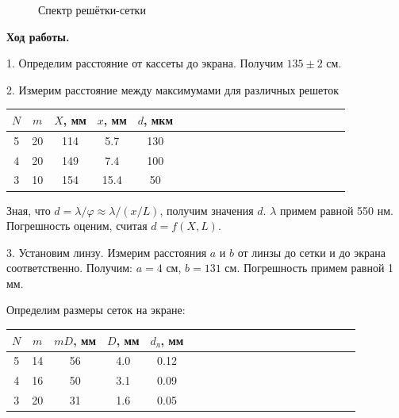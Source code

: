 \documentclass[14pt]{article}
\begin{document}
\begin{figure}[h!]
	\caption{Спектр решётки-сетки}
	\label{fig:image}
\end{figure}


\newpage
\textbf{Ход работы.}

1. Определим расстояние от кассеты до экрана. Получим $135 \pm 2$ см.

2. Измерим расстояние между максимумами для различных решеток

\begin{center}
\begin{tabular}{|c|c|c|c|c|c|c|c|c|c|c|c|c|c|c|c|c|c|c|c|}
\hline
$N$		&	$m$		&	$X$, мм		&	$x$, мм		&	$d$, мкм		\\
\hline
5		&	20		&	114			&	5.7			&	130				\\
\hline
4		&	20		&	149			&	7.4			&	100				\\
\hline
3		&	10		&	154			&	15.4		&	50				\\
\hline
\end{tabular}
\end{center}

Зная, что $d = \lambda/\varphi \approx \lambda/(x/L)$, получим значения $d$. $\lambda$ примем равной 550 нм. Погрешность оценим, считая $d = f(X, L)$.

\vspace{1cm}

3. Установим линзу. Измерим расстояния $a$ и $b$ от линзы до сетки и до экрана соответственно. Получим: $a = 4$ см, $b = 131$ см. Погрешность примем равной 1 мм. 

Определим размеры сеток на экране:

\begin{center}
\begin{tabular}{|c|c|c|c|c|c|c|c|c|c|c|c|c|c|c|c|c|c|c|c|}
\hline
$N$		&	$m$		&	$mD$, мм	&	$D$, мм		&	$d_\text{л}$, мм	\\
\hline
5		&	14		&	56			&	4.0			&	0.12				\\
\hline
4		&	16		&	50			&	3.1			&	0.09				\\
\hline
3		&	20		&	31			&	1.6			&	0.05				\\
\hline
\end{tabular}
\end{center}
\end{document}
